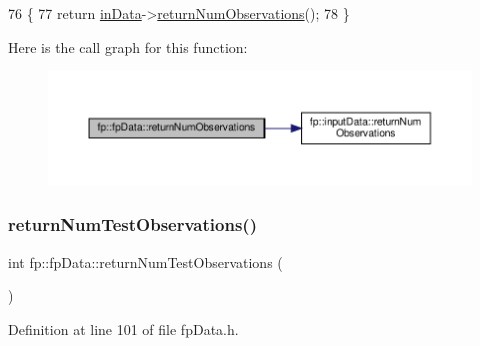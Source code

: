 \begin{DoxyCode}
76                                               \{
77                 \textcolor{keywordflow}{return} \hyperlink{classfp_1_1fpData_a49d7c3f58bcf88843c25b1b0c9714ebe}{inData}->\hyperlink{classfp_1_1inputData_af7dc02941195e025d1d89c882096027d}{returnNumObservations}();
78             \}
\end{DoxyCode}
Here is the call graph for this function\+:
\nopagebreak
\begin{figure}[H]
\begin{center}
\leavevmode
\includegraphics[width=350pt]{classfp_1_1fpData_a9056a8c0e7e48fe9aa591269064ecc43_cgraph}
\end{center}
\end{figure}
\mbox{\label{classfp_1_1fpData_a9a115d29fafb6e5b941f4e0c860e65e7}} 
\subsubsection{\texorpdfstring{return\+Num\+Test\+Observations()}{returnNumTestObservations()}}
{\footnotesize\ttfamily int fp\+::fp\+Data\+::return\+Num\+Test\+Observations (\begin{DoxyParamCaption}{ }\end{DoxyParamCaption})\hspace{0.3cm}{\ttfamily [inline]}}



Definition at line 101 of file fp\+Data.\+h.


